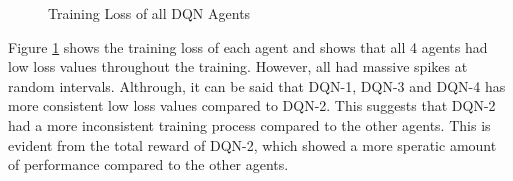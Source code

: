 \begin{figure}[H]
    \centering
    \caption{Training Loss of all DQN Agents}
    \label{fig:DQN_training_loss}
\end{figure}

Figure \ref{fig:DQN_training_loss} shows the training loss of each agent and shows that all 4 agents had low loss values throughout the training. However, all had massive spikes at random intervals. Althrough, it can be said that DQN-1, DQN-3 and DQN-4 has more consistent low loss values compared to DQN-2. This suggests that DQN-2 had a more inconsistent training process compared to the other agents. This is evident from the total reward of DQN-2, which showed a more speratic amount of performance compared to the other agents.

